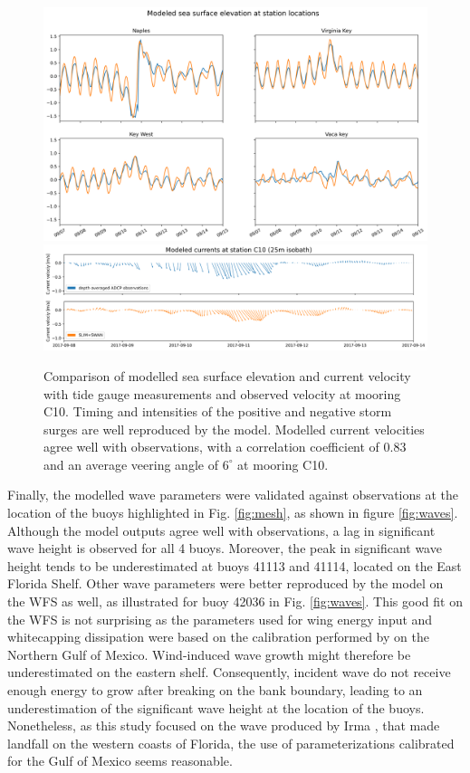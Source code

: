 \documentclass[11pt,a4paper]{article}
\begin{document}
\begin{figure}
    \centering
    \includegraphics[width=.95\textwidth]{fig/elevation_with_map.png}
    \includegraphics[width=.95\textwidth]{fig/validation_currents_C10_ww3.png}
    \caption{Comparison of modelled sea surface elevation and current velocity with tide gauge measurements and observed velocity at mooring C10. Timing and intensities of the positive and negative storm surges are well reproduced by the model. Modelled current velocities agree well with observations, with a correlation coefficient of 0.83 and an average veering angle of $6^\circ$ at mooring C10.}
    \label{fig:hydro}
\end{figure}

Finally, the modelled wave parameters were validated against observations at the location of the buoys highlighted in Fig. \ref{fig:mesh}, as shown in figure \ref{fig:waves}. Although the model outputs agree well with observations, a lag in significant wave height is observed for all 4 buoys. Moreover, the peak in significant wave height tends to be underestimated at buoys 41113 and 41114, located on the East Florida Shelf. Other wave parameters were better reproduced by the model on the WFS as well, as illustrated for buoy 42036 in Fig. \ref{fig:waves}. This good fit on the WFS is not surprising as the parameters used for wing energy input and whitecapping dissipation were based on the calibration performed by \citep{siadatmousavi2011evaluation} on the Northern Gulf of Mexico. Wind-induced wave growth might therefore be underestimated on the eastern shelf. Consequently, incident wave do not receive enough energy to grow after breaking on the bank boundary, leading to an underestimation of the significant wave height at the location of the buoys. Nonetheless, as this study focused on the wave produced by Irma , that made landfall on the western coasts of Florida, the use of parameterizations calibrated for the Gulf of Mexico seems reasonable.
\end{document}
